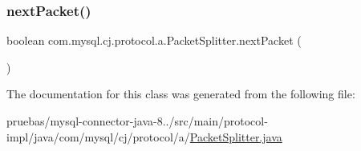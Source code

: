 \mbox{\label{classcom_1_1mysql_1_1cj_1_1protocol_1_1a_1_1_packet_splitter_a459dc7fa27caddbb835946d20e8c9bf9}} 
\subsubsection{\texorpdfstring{next\+Packet()}{nextPacket()}}
{\footnotesize\ttfamily boolean com.\+mysql.\+cj.\+protocol.\+a.\+Packet\+Splitter.\+next\+Packet (\begin{DoxyParamCaption}{ }\end{DoxyParamCaption})}



The documentation for this class was generated from the following file\+:\begin{DoxyCompactItemize}
\item 
pruebas/mysql-\/connector-\/java-\/8../src/main/protocol-\/impl/java/com/mysql/cj/protocol/a/\mbox{\hyperlink{_packet_splitter_8java}{Packet\+Splitter.\+java}}\end{DoxyCompactItemize}
